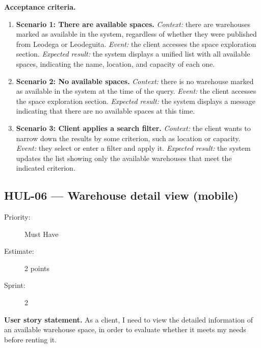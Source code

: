 \documentclass[11pt,a4paper,oneside]{report}
\begin{document}
\textbf{Acceptance criteria.}
\begin{enumerate}
\item \textbf{Scenario 1: There are available spaces.} \emph{Context:} there are warehouses marked as available in the system, regardless of whether they were published from Leodega or Leodeguita. \emph{Event:} the client accesses the space exploration section. \emph{Expected result:} the system displays a unified list with all available spaces, indicating the name, location, and capacity of each one.
\item \textbf{Scenario 2: No available spaces.} \emph{Context:} there is no warehouse marked as available in the system at the time of the query. \emph{Event:} the client accesses the space exploration section. \emph{Expected result:} the system displays a message indicating that there are no available spaces at this time.
\item \textbf{Scenario 3: Client applies a search filter.} \emph{Context:} the client wants to narrow down the results by some criterion, such as location or capacity. \emph{Event:} they select or enter a filter and apply it. \emph{Expected result:} the system updates the list showing only the available warehouses that meet the indicated criterion.
\end{enumerate}

\subsection{HUL-06 --- Warehouse detail view (mobile)}
\label{req:HUL-06}
\begin{description}
\item[Priority:] Must Have \quad \item[Estimate:] 2 points \quad \item[Sprint:] 2
\end{description}

\textbf{User story statement.} As a client, I need to view the detailed information of an available warehouse space, in order to evaluate whether it meets my needs before renting it.
\end{document}
